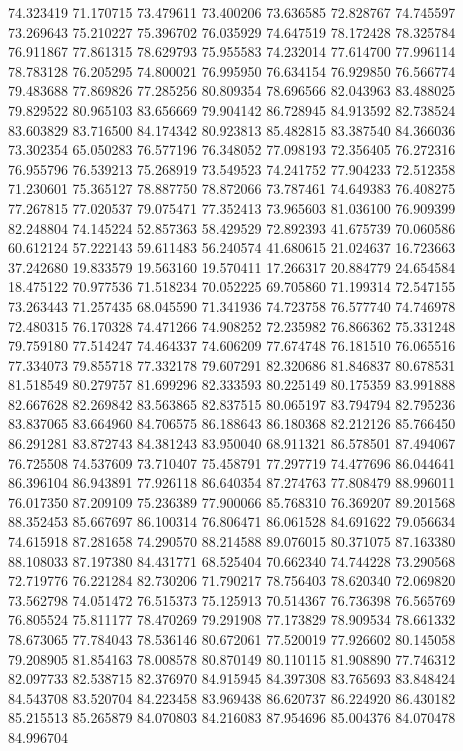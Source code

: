 74.323419
71.170715
73.479611
73.400206
73.636585
72.828767
74.745597
73.269643
75.210227
75.396702
76.035929
74.647519
78.172428
78.325784
76.911867
77.861315
78.629793
75.955583
74.232014
77.614700
77.996114
78.783128
76.205295
74.800021
76.995950
76.634154
76.929850
76.566774
79.483688
77.869826
77.285256
80.809354
78.696566
82.043963
83.488025
79.829522
80.965103
83.656669
79.904142
86.728945
84.913592
82.738524
83.603829
83.716500
84.174342
80.923813
85.482815
83.387540
84.366036
73.302354
65.050283
76.577196
76.348052
77.098193
72.356405
76.272316
76.955796
76.539213
75.268919
73.549523
74.241752
77.904233
72.512358
71.230601
75.365127
78.887750
78.872066
73.787461
74.649383
76.408275
77.267815
77.020537
79.075471
77.352413
73.965603
81.036100
76.909399
82.248804
74.145224
52.857363
58.429529
72.892393
41.675739
70.060586
60.612124
57.222143
59.611483
56.240574
41.680615
21.024637
16.723663
37.242680
19.833579
19.563160
19.570411
17.266317
20.884779
24.654584
18.475122
70.977536
71.518234
70.052225
69.705860
71.199314
72.547155
73.263443
71.257435
68.045590
71.341936
74.723758
76.577740
74.746978
72.480315
76.170328
74.471266
74.908252
72.235982
76.866362
75.331248
79.759180
77.514247
74.464337
74.606209
77.674748
76.181510
76.065516
77.334073
79.855718
77.332178
79.607291
82.320686
81.846837
80.678531
81.518549
80.279757
81.699296
82.333593
80.225149
80.175359
83.991888
82.667628
82.269842
83.563865
82.837515
80.065197
83.794794
82.795236
83.837065
83.664960
84.706575
86.188643
86.180368
82.212126
85.766450
86.291281
83.872743
84.381243
83.950040
68.911321
86.578501
87.494067
76.725508
74.537609
73.710407
75.458791
77.297719
74.477696
86.044641
86.396104
86.943891
77.926118
86.640354
87.274763
77.808479
88.996011
76.017350
87.209109
75.236389
77.900066
85.768310
76.369207
89.201568
88.352453
85.667697
86.100314
76.806471
86.061528
84.691622
79.056634
74.615918
87.281658
74.290570
88.214588
89.076015
80.371075
87.163380
88.108033
87.197380
84.431771
68.525404
70.662340
74.744228
73.290568
72.719776
76.221284
82.730206
71.790217
78.756403
78.620340
72.069820
73.562798
74.051472
76.515373
75.125913
70.514367
76.736398
76.565769
76.805524
75.811177
78.470269
79.291908
77.173829
78.909534
78.661332
78.673065
77.784043
78.536146
80.672061
77.520019
77.926602
80.145058
79.208905
81.854163
78.008578
80.870149
80.110115
81.908890
77.746312
82.097733
82.538715
82.376970
84.915945
84.397308
83.765693
83.848424
84.543708
83.520704
84.223458
83.969438
86.620737
86.224920
86.430182
85.215513
85.265879
84.070803
84.216083
87.954696
85.004376
84.070478
84.996704
